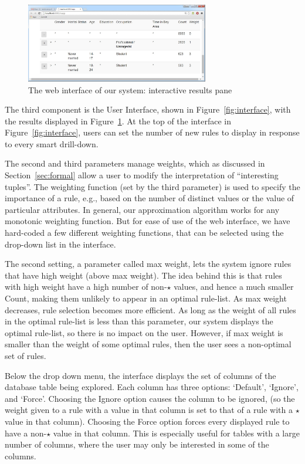 \begin{figure}[ht]
\vspace{-5pt}
\centering
\includegraphics[width=80mm,frame]{graphs/uiresults.jpg}
\vspace{-5pt}
\caption{The web interface of our system: interactive results pane \label{fig:results}}
\vspace{-5pt}
\end{figure}

 The third component is the User Interface, 
shown in Figure~\ref{fig:interface}, with the results displayed in Figure~\ref{fig:results}.
At the top of the interface in Figure~\ref{fig:interface}, users can set the number 
of new rules to display in response to every smart drill-down. 

The second and third parameters manage weights, which as discussed in Section~\ref{sec:formal} allow a user to modify the interpretation of ``interesting tuples''.
The weighting function (set by the third parameter) is used to specify the importance of a rule, e.g., based on the number of distinct values or the value of particular attributes. In general, our approximation algorithm works for any monotonic weighting function. 
But for ease of use of the web interface, we have hard-coded a few different weighting functions, that can be selected using the drop-down list in the interface.

The second setting, a parameter called max weight, lets the system ignore rules that have high weight (above max weight). The idea behind this is that rules with high weight have a high number of non-$\star$ values, and hence a much smaller Count, making them unlikely to appear in an optimal rule-list. As max weight decreases, rule selection becomes more efficient. As long as the weight of all rules in the optimal rule-list is less than this
parameter, our system displays the optimal rule-list, so there is no impact on the user. However, if max weight is smaller than the weight of some optimal rules, then the user sees a non-optimal set of rules.

Below the drop down menu, the interface displays the set of columns of the database table being explored. Each column has three options: `Default', `Ignore', and `Force'. Choosing the Ignore option causes the column to be ignored, (so the weight given to a rule with a value in that column is set to that of a rule with a $\star$ value in that column). Choosing the Force option forces every displayed rule to have a non-$\star$ value in that column. This is especially useful for tables with a large number of columns, where the user may only be interested in some of the columns. 

